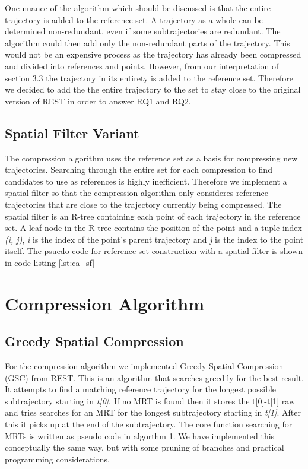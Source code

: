 One nuance of the algorithm which should be discussed is that the entire trajectory is added to the reference set. A trajectory as a whole can be determined non-redundant, even if some subtrajectories are redundant. The algorithm could then add only the non-redundant parts of the trajectory. This would not be an expensive process as the trajectory has already been compressed and divided into references and points. However, from our interpretation of \cite{zhao2018rest} section 3.3 the trajectory in its entirety is added to the reference set. Therefore we decided to add the the entire trajectory to the set to stay close to the original version of REST in order to answer RQ1 and RQ2.

\subsection{Spatial Filter Variant}

The compression algorithm uses the reference set as a basis for compressing new trajectories. Searching through the entire set for each compression to find candidates to use as references is highly inefficient. Therefore we implement a spatial filter so that the compression algorithm only consideres reference trajectories that are close to the trajectory currently being compressed. The spatial filter is an R-tree containing each point of each trajectory in the reference set. A leaf node in the R-tree contains the position of the point and a tuple index \textit{(i, j)}, \textit{i} is the index of the point's parent trajectory and \textit{j} is the index to the point itself. The psuedo code for reference set construction with a spatial filter is shown in code listing \ref{lst:ca_sf}

\section{Compression Algorithm}
\subsection{Greedy Spatial Compression}
For the compression algorithm we implemented Greedy Spatial Compression (GSC) from REST. This is an algorithm that searches greedily for the best result. It attempts to find a matching reference trajectory for the longest possible subtrajectory starting in \textit{t[0]}. If no MRT is found then it stores the t[0]-t[1] raw and tries searches for an MRT for the longest subtrajectory starting in \textit{t[1]}. After this it picks up at the end of the subtrajectory. The core function searching for MRTs is written as pseudo code in \cite{zhao2018rest} algorthm 1. We have implemented this conceptually the same way, but with some pruning of branches and practical programming considerations.

